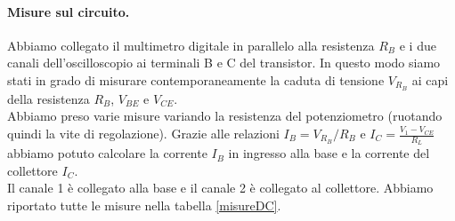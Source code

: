 \documentclass[10pt,a4paper]{article}
\begin{document}
\paragraph{Misure sul circuito.}

Abbiamo collegato il multimetro digitale in parallelo alla resistenza $R_B$ e i due canali dell'oscilloscopio ai terminali B e C del transistor. In questo modo siamo stati in grado di misurare contemporaneamente la caduta di tensione $V_{R_B}$ ai capi della resistenza $R_B$, $V_{BE}$ e $V_{CE}$.\\
Abbiamo preso varie misure variando la resistenza del potenziometro (ruotando quindi la vite di regolazione). Grazie alle relazioni $I_B = V_{R_B}/R_B$ e $I_C = \frac{V_1-V_{CE}}{R_L}$ abbiamo potuto calcolare la corrente $I_B$ in ingresso alla base e la corrente del collettore $I_C$.\\
Il canale 1 è collegato alla base e il canale 2 è collegato al collettore.
Abbiamo riportato tutte le misure nella tabella \ref{misureDC}.
\end{document}
